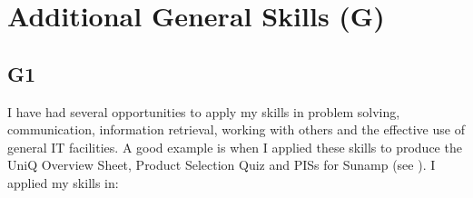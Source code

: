 
\section{Additional General Skills (G)}


\subsection*{G1}

I have had several opportunities to apply my skills in problem solving, communication, information retrieval, working with others and the effective use of general IT facilities.
A good example is when I applied these skills to produce the UniQ Overview Sheet, Product Selection Quiz and PISs for Sunamp (see ).
I applied my skills in:
